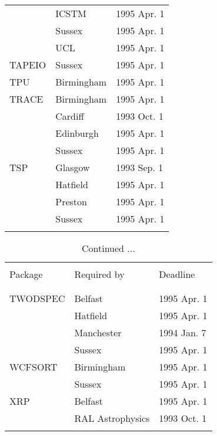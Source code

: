 \begin{table}
\begin{center}
\begin{tabular}{|p{36mm}|p{50mm}|p{30mm}|}
                        & ICSTM            & 1995 Apr. 1 \\
                        & Sussex           & 1995 Apr. 1 \\
                        & UCL              & 1995 Apr. 1 \\
TAPEIO                  & Sussex           & 1995 Apr. 1 \\
TPU                     & Birmingham       & 1995 Apr. 1 \\
TRACE                   & Birmingham       & 1995 Apr. 1 \\
                        & Cardiff          & 1993 Oct. 1 \\
                        & Edinburgh        & 1995 Apr. 1 \\
                        & Sussex           & 1995 Apr. 1 \\
TSP                     & Glasgow          & 1993 Sep. 1 \\
                        & Hatfield         & 1995 Apr. 1 \\
                        & Preston          & 1995 Apr. 1 \\
                        & Sussex           & 1995 Apr. 1 \\
& & \\ \hline
\end{tabular}
\end{center}
\end{table}


\addtocounter{table}{-1}
\begin{table}
\caption{Continued ...}
\vspace{5mm}
\begin{center}
\begin{tabular}{|p{36mm}|p{50mm}|p{30mm}|} \hline
& & \\
Package & Required by & Deadline \\
& & \\ \hline
& & \\
TWODSPEC                & Belfast          & 1995 Apr. 1 \\
                        & Hatfield         & 1995 Apr. 1 \\
                        & Manchester       & 1994 Jan. 7 \\
                        & Sussex           & 1995 Apr. 1 \\
WCFSORT                 & Birmingham       & 1995 Apr. 1 \\
                        & Sussex           & 1995 Apr. 1 \\
XRP                     & Belfast          & 1995 Apr. 1 \\
                        & RAL Astrophysics & 1993 Oct. 1 \\
& & \\ \hline
\end{tabular}
\end{center}
\end{table}


